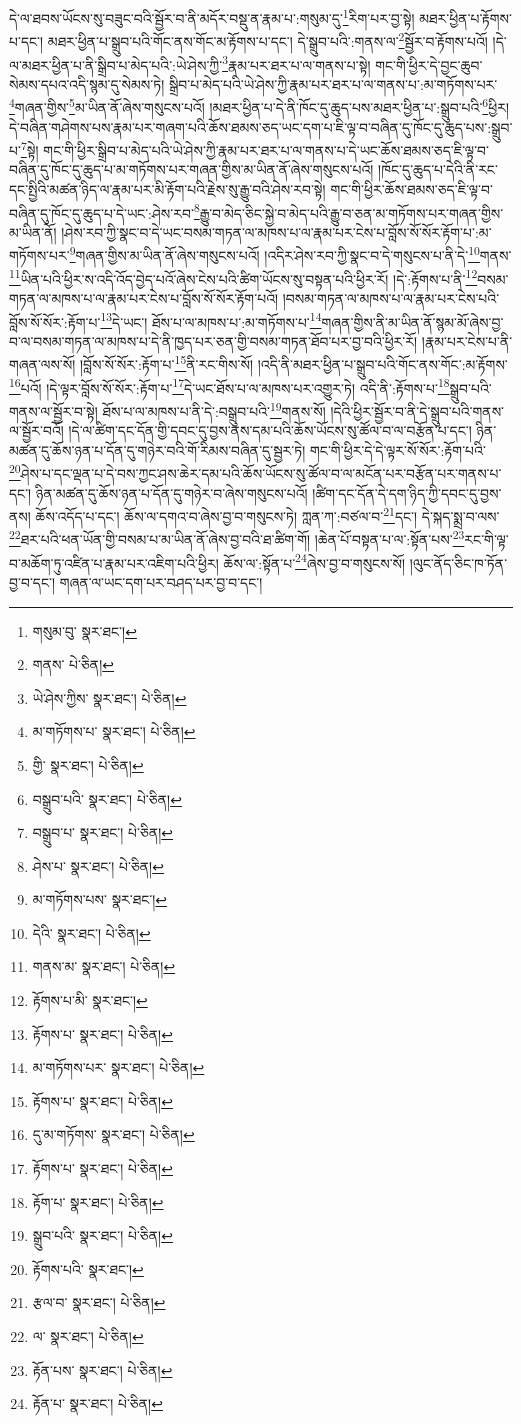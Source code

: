 དེ་ལ་ཐབས་ཡོངས་སུ་བཟུང་བའི་སྦྱོར་བ་ནི་མདོར་བསྡུ་ན་རྣམ་པ་:གསུམ་དུ་\footnote{གསུམ་བུ་  སྣར་ཐང་། }རིག་པར་བྱ་སྟེ། མཐར་ཕྱིན་པ་རྟོགས་པ་དང་། མཐར་ཕྱིན་པ་སྒྲུབ་པའི་གོང་ནས་གོང་མ་རྟོགས་པ་དང་། དེ་སྒྲུབ་པའི་:གནས་ལ་\footnote{གནས་  པེ་ཅིན། }སྦྱོར་བ་རྟོགས་པའོ། །དེ་ལ་མཐར་ཕྱིན་པ་ནི་སྒྲིབ་པ་མེད་པའི་:ཡེ་ཤེས་ཀྱི་\footnote{ཡེ་ཤེས་ཀྱིས་  སྣར་ཐང་།  པེ་ཅིན། }རྣམ་པར་ཐར་པ་ལ་གནས་པ་སྟེ། གང་གི་ཕྱིར་དེ་བྱང་ཆུབ་སེམས་དཔའ་འདི་སྙམ་དུ་སེམས་ཏེ། སྒྲིབ་པ་མེད་པའི་ཡེ་ཤེས་ཀྱི་རྣམ་པར་ཐར་པ་ལ་གནས་པ་:མ་གཏོགས་པར་\footnote{མ་གཏོགས་པ་  སྣར་ཐང་།  པེ་ཅིན། }གཞན་གྱིས་\footnote{གྱི་  སྣར་ཐང་།  པེ་ཅིན། }མ་ཡིན་ནོ་ཞེས་གསུངས་པའོ། །མཐར་ཕྱིན་པ་དེ་ནི་ཁོང་དུ་ཆུད་པས་མཐར་ཕྱིན་པ་:སྒྲུབ་པའི་\footnote{བསྒྲུབ་པའི་  སྣར་ཐང་།  པེ་ཅིན། }ཕྱིར། དེ་བཞིན་གཤེགས་པས་རྣམ་པར་གཞག་པའི་ཆོས་ཐམས་ཅད་ཡང་དག་པ་ཇི་ལྟ་བ་བཞིན་དུ་ཁོང་དུ་ཆུད་པས་:སྒྲུབ་པ་\footnote{བསྒྲུབ་པ་  སྣར་ཐང་།  པེ་ཅིན། }སྟེ། གང་གི་ཕྱིར་སྒྲིབ་པ་མེད་པའི་ཡེ་ཤེས་ཀྱི་རྣམ་པར་ཐར་པ་ལ་གནས་པ་དེ་ཡང་ཆོས་ཐམས་ཅད་ཇི་ལྟ་བ་བཞིན་དུ་ཁོང་དུ་ཆུད་པ་མ་གཏོགས་པར་གཞན་གྱིས་མ་ཡིན་ནོ་ཞེས་གསུངས་པའོ། །ཁོང་དུ་ཆུད་པ་དེའི་ནི་རང་དང་སྤྱིའི་མཚན་ཉིད་ལ་རྣམ་པར་མི་རྟོག་པའི་རྗེས་སུ་རྒྱུ་བའི་ཤེས་རབ་སྟེ། གང་གི་ཕྱིར་ཆོས་ཐམས་ཅད་ཇི་ལྟ་བ་བཞིན་དུ་ཁོང་དུ་ཆུད་པ་དེ་ཡང་:ཤེས་རབ་\footnote{ཤེས་པ་  སྣར་ཐང་།  པེ་ཅིན། }རྒྱུ་བ་མེད་ཅིང་སྐྱེ་བ་མེད་པའི་རྒྱུ་བ་ཅན་མ་གཏོགས་པར་གཞན་གྱིས་མ་ཡིན་ནོ། །ཤེས་རབ་ཀྱི་སྣང་བ་དེ་ཡང་བསམ་གཏན་ལ་མཁས་པ་ལ་རྣམ་པར་ངེས་པ་བློས་སོ་སོར་རྟོག་པ་:མ་གཏོགས་པར་\footnote{མ་གཏོགས་པས་  སྣར་ཐང་། }གཞན་གྱིས་མ་ཡིན་ནོ་ཞེས་གསུངས་པའོ། །འདིར་ཤེས་རབ་ཀྱི་སྣང་བ་དེ་གསུངས་པ་ནི་དེ་\footnote{དེའི་  སྣར་ཐང་།  པེ་ཅིན། }གནས་\footnote{གནས་མ་  སྣར་ཐང་།  པེ་ཅིན། }ཡིན་པའི་ཕྱིར་ས་འདི་འོད་བྱེད་པའོ་ཞེས་ངེས་པའི་ཚིག་ཡོངས་སུ་བསྟན་པའི་ཕྱིར་རོ། །དེ་:རྟོགས་པ་ནི་\footnote{རྟོགས་པ་མི་  སྣར་ཐང་། }བསམ་གཏན་ལ་མཁས་པ་ལ་རྣམ་པར་ངེས་པ་བློས་སོ་སོར་རྟོག་པའོ། །བསམ་གཏན་ལ་མཁས་པ་ལ་རྣམ་པར་ངེས་པའི་བློས་སོ་སོར་:རྟོག་པ་\footnote{རྟོགས་པ་  སྣར་ཐང་།  པེ་ཅིན། }དེ་ཡང་། ཐོས་པ་ལ་མཁས་པ་:མ་གཏོགས་པ་\footnote{མ་གཏོགས་པར་  སྣར་ཐང་།  པེ་ཅིན། }གཞན་གྱིས་ནི་མ་ཡིན་ནོ་སྙམ་མོ་ཞེས་བྱ་བ་ལ་བསམ་གཏན་ལ་མཁས་པ་དེ་ནི་ཁྱད་པར་ཅན་གྱི་བསམ་གཏན་ཐོབ་པར་བྱ་བའི་ཕྱིར་རོ། །རྣམ་པར་ངེས་པ་ནི་གཞན་ལས་སོ། །བློས་སོ་སོར་:རྟོག་པ་\footnote{རྟོགས་པ་  སྣར་ཐང་།  པེ་ཅིན། }ནི་རང་གིས་སོ། །འདི་ནི་མཐར་ཕྱིན་པ་སྒྲུབ་པའི་གོང་ནས་གོང་:མ་རྟོགས་\footnote{དུ་མ་གཏོགས་  སྣར་ཐང་།  པེ་ཅིན། }པའོ། །དེ་ལྟར་བློས་སོ་སོར་:རྟོག་པ་\footnote{རྟོགས་པ་  སྣར་ཐང་།  པེ་ཅིན། }དེ་ཡང་ཐོས་པ་ལ་མཁས་པར་འགྱུར་ཏེ། འདི་ནི་:རྟོགས་པ་\footnote{རྟོག་པ་  སྣར་ཐང་།  པེ་ཅིན། }སྒྲུབ་པའི་གནས་ལ་སྦྱོར་བ་སྟེ། ཐོས་པ་ལ་མཁས་པ་ནི་དེ་:བསྒྲུབ་པའི་\footnote{སྒྲུབ་པའི་  སྣར་ཐང་།  པེ་ཅིན། }གནས་སོ། །དེའི་ཕྱིར་སྦྱོར་བ་ནི་དེ་སྒྲུབ་པའི་གནས་ལ་སྦྱོར་བའོ། །དེ་ལ་ཚིག་དང་དོན་གྱི་དབང་དུ་བྱས་ནས་དམ་པའི་ཆོས་ཡོངས་སུ་ཚོལ་བ་ལ་བརྩོན་པ་དང་། ཉིན་མཚན་དུ་ཆོས་ཉན་པ་དོན་དུ་གཉེར་བའི་གོ་རིམས་བཞིན་དུ་སྦྱར་ཏེ། གང་གི་ཕྱིར་དེ་དེ་ལྟར་སོ་སོར་:རྟོག་པའི་\footnote{རྟོགས་པའི་  སྣར་ཐང་། }ཤེས་པ་དང་ལྡན་པ་དེ་བས་ཀྱང་ཤས་ཆེར་དམ་པའི་ཆོས་ཡོངས་སུ་ཚོལ་བ་ལ་མངོན་པར་བརྩོན་པར་གནས་པ་དང་། ཉིན་མཚན་དུ་ཆོས་ཉན་པ་དོན་དུ་གཉེར་བ་ཞེས་གསུངས་པའོ། །ཚིག་དང་དོན་དེ་དག་ཉིད་ཀྱི་དབང་དུ་བྱས་ནས། ཆོས་འདོད་པ་དང་། ཆོས་ལ་དགའ་བ་ཞེས་བྱ་བ་གསུངས་ཏེ། ཀླན་ཀ་:བཙལ་བ་\footnote{རྩལ་བ་  སྣར་ཐང་།  པེ་ཅིན། }དང་། དེ་སྐད་སྨྲ་བ་ལས་\footnote{ལ་  སྣར་ཐང་།  པེ་ཅིན། }ཐར་པའི་ཕན་ཡོན་གྱི་བསམ་པ་མ་ཡིན་ནོ་ཞེས་བྱ་བའི་ཐ་ཚིག་གོ། །ཆེན་པོ་བསྟན་པ་ལ་:སྟོན་པས་\footnote{རྟོན་པས་  སྣར་ཐང་།  པེ་ཅིན། }རང་གི་ལྟ་བ་མཆོག་ཏུ་འཛིན་པ་རྣམ་པར་འཇིག་པའི་ཕྱིར། ཆོས་ལ་:སྟོན་པ་\footnote{རྟོན་པ་  སྣར་ཐང་།  པེ་ཅིན། }ཞེས་བྱ་བ་གསུངས་སོ། །ལུང་ནོད་ཅིང་ཁ་ཏོན་བྱ་བ་དང་། གཞན་ལ་ཡང་དག་པར་བཤད་པར་བྱ་བ་དང་། 